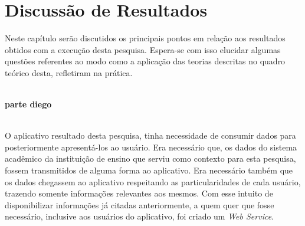 \documentclass[french]{article}
\begin{document}
\section{Discussão de Resultados}

	\par Neste capítulo serão discutidos os principais pontos em relação 
aos resultados obtidos com a execução desta pesquisa. Espera-se com isso
elucidar algumas questões referentes ao modo como a aplicação das teorias
descritas no quadro teórico desta, refletiram na prática.\\\\
	\par \textbf{parte diego}\\\\

	\par O aplicativo resultado desta pesquisa, tinha necessidade de
consumir dados para posteriormente apresentá-los ao usuário. Era 
necessário que, os dados do sistema acadêmico da instituição de ensino 
que serviu como contexto para esta pesquisa, fossem transmitidos de alguma
forma ao aplicativo. Era necessário também que os dados chegassem ao 
aplicativo respeitando as particularidades de cada usuário, trazendo somente 
informações relevantes aos mesmos. Com esse intuito de disponibilizar 
informações já citadas anteriormente, a quem quer que fosse necessário, 
inclusive aos usuários do aplicativo, foi criado um \textit{Web Service}.
	\par  

	
	
\end{document}
